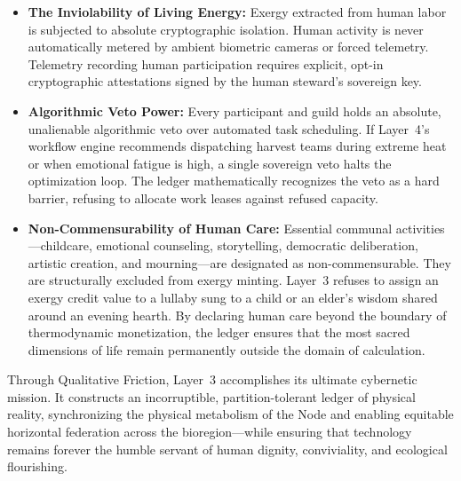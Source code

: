 \begin{itemize}
  \item \textbf{The Inviolability of Living Energy:} Exergy extracted from human labor is subjected to absolute cryptographic isolation. Human activity is never automatically metered by ambient biometric cameras or forced telemetry. Telemetry recording human participation requires explicit, opt-in cryptographic attestations signed by the human steward's sovereign key.
  \item \textbf{Algorithmic Veto Power:} Every participant and guild holds an absolute, unalienable algorithmic veto over automated task scheduling. If Layer~4's workflow engine recommends dispatching harvest teams during extreme heat or when emotional fatigue is high, a single sovereign veto halts the optimization loop. The ledger mathematically recognizes the veto as a hard barrier, refusing to allocate work leases against refused capacity.
  \item \textbf{Non-Commensurability of Human Care:} Essential communal activities---childcare, emotional counseling, storytelling, democratic deliberation, artistic creation, and mourning---are designated as non-commensurable. They are structurally excluded from exergy minting. Layer~3 refuses to assign an exergy credit value to a lullaby sung to a child or an elder's wisdom shared around an evening hearth. By declaring human care beyond the boundary of thermodynamic monetization, the ledger ensures that the most sacred dimensions of life remain permanently outside the domain of calculation.
\end{itemize}

Through Qualitative Friction, Layer~3 accomplishes its ultimate cybernetic mission. It constructs an incorruptible, partition-tolerant ledger of physical reality, synchronizing the physical metabolism of the Node and enabling equitable horizontal federation across the bioregion---while ensuring that technology remains forever the humble servant of human dignity, conviviality, and ecological flourishing.

